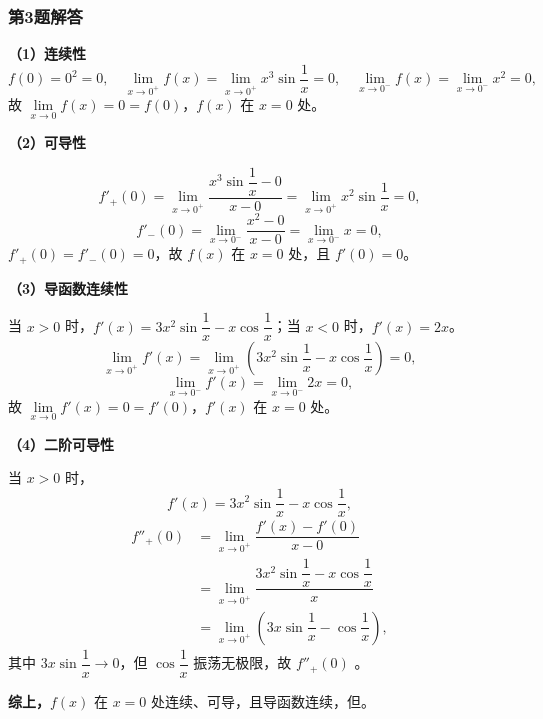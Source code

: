 \documentclass[./book.tex]{subfiles}
\begin{document}
    \subsubsection*{第3题解答}
    \begin{analysisbox}
        \textbf{（1）连续性}
        \[
            f(0) = 0^2 = 0, \quad
            \lim_{x\to 0^+} f(x) = \lim_{x\to 0^+} x^3\sin\dfrac{1}{x} = 0, \quad
            \lim_{x\to 0^-} f(x) = \lim_{x\to 0^-} x^2 = 0,
        \]
        故 $\lim\limits_{x\to 0} f(x) = 0 = f(0)$，$f(x)$ 在 $x=0$ 处{\color{red}{连续}}。

        \textbf{（2）可导性}

        \[
            f'_+(0) = \lim_{x\to 0^+} \dfrac{x^3\sin\dfrac{1}{x} - 0}{x - 0}
            = \lim_{x\to 0^+} x^2\sin\dfrac{1}{x} = 0,
        \]
        \[
            f'_-(0) = \lim_{x\to 0^-} \dfrac{x^2 - 0}{x - 0}
            = \lim_{x\to 0^-} x = 0,
        \]
        $f'_+(0) = f'_-(0) = 0$，故 $f(x)$ 在 $x=0$ 处{\color{red}{可导}}，且 $f'(0) = 0$。

        \textbf{（3）导函数连续性}

        当 $x > 0$ 时，$f'(x) = 3x^2\sin\dfrac{1}{x} - x\cos\dfrac{1}{x}$；当 $x < 0$ 时，$f'(x) = 2x$。
        \[
            \lim_{x\to 0^+} f'(x) = \lim_{x\to 0^+}\left(3x^2\sin\dfrac{1}{x} - x\cos\dfrac{1}{x}\right) = 0,
        \]
        \[
            \lim_{x\to 0^-} f'(x) = \lim_{x\to 0^-} 2x = 0,
        \]
        故 $\lim\limits_{x\to 0} f'(x) = 0 = f'(0)$，$f'(x)$ 在 $x=0$ 处{\color{red}{连续}}。

        \textbf{（4）二阶可导性}

        当 $x > 0$ 时，
        \[
            f'(x) = 3x^2\sin\dfrac{1}{x} - x\cos\dfrac{1}{x},
        \]
        \[
            \begin{aligned}
                f''_+(0) &= \lim_{x\to 0^+} \dfrac{f'(x) - f'(0)}{x - 0} \\[0.5em]
                &= \lim_{x\to 0^+} \dfrac{3x^2\sin\dfrac{1}{x} - x\cos\dfrac{1}{x}}{x} \\[0.5em]
                &= \lim_{x\to 0^+}\left(3x\sin\dfrac{1}{x} - \cos\dfrac{1}{x}\right),
            \end{aligned}
        \]
        其中 $3x\sin\dfrac{1}{x} \to 0$，但 $\cos\dfrac{1}{x}$ 振荡无极限，故 $f''_+(0)$ {\color{red}{不存在}}。

        \medskip

        \textbf{综上，}$f(x)$ 在 $x=0$ 处连续、可导，且导函数连续，但{\color{red}{不可二次可导}}。
    \end{analysisbox}
\end{document}
